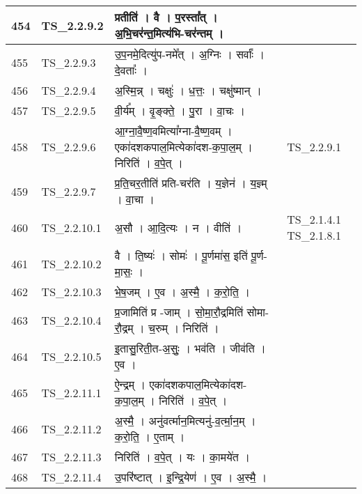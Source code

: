 \documentclass[17pt]{extarticle}
\begin{document}
\begin{longtable}{||p{0.4in}||p{0.9in}||p{4.0in}||p{0.9in}||}
        \hline
            454 & TS\_2.2.9.2 & प्रतीति॑   ।   वै   ।   प॒रस्ता᳚त्   ।   अ॒भि॒चर॑न्त॒मित्य॑भि{-}चर॑न्तम्   ।    &      \\
        \hline
            455 & TS\_2.2.9.3 & उ॒प॒नमे॒दित्यु॑प{-}नमे᳚त्   ।   अ॒ग्निः   ।   सर्वाः᳚   ।   दे॒वताः᳚   ।    &      \\
        \hline
            456 & TS\_2.2.9.4 & अ॒स्मि॒न्न्   ।   चक्षुः॑   ।   ध॒त्तः॒   ।   चक्षु॑ष्मान्   ।    &      \\
        \hline
            457 & TS\_2.2.9.5 & वी॒र्य᳚म्   ।   वृ॒ङ्क्ते॒   ।   पु॒रा   ।   वा॒चः   ।    &      \\
        \hline
            458 & TS\_2.2.9.6 & आ॒ग्ना॒वै॒ष्ण॒वमित्या᳚ग्ना{-}वै॒ष्ण॒वम्   ।   एका॑दशकपाल॒मित्येका॑दश{-}क॒पा॒ल॒म्   ।   निरिति॑   ।   व॒पे॒त्   ।    & TS\_2.2.9.1        \\
        \hline
            459 & TS\_2.2.9.7 & प्र॒ति॒चर॒तीति॑ प्रति{-}चर॑ति   ।   य॒ज्ञेन॑   ।   य॒ज्ञ्म्   ।   वा॒चा   ।    &      \\
        \hline
            460 & TS\_2.2.10.1 & अ॒सौ   ।   आ॒दि॒त्यः   ।   न   ।   वीति॑   ।    & TS\_2.1.4.1 TS\_2.1.8.1        \\
        \hline
            461 & TS\_2.2.10.2 & वै   ।   ति॒ष्यः॑   ।   सोमः॑   ।   पू॒र्णमा॑स॒ इति॑ पू॒र्ण{-}मा॒सः॒   ।    &      \\
        \hline
            462 & TS\_2.2.10.3 & भे॒ष॒जम्   ।   ए॒व   ।   अ॒स्मै॒   ।   क॒रो॒ति॒   ।    &      \\
        \hline
            463 & TS\_2.2.10.4 & प्र॒जामिति॑ प्र {-}जाम्   ।   सो॒मा॒रौ॒द्रमिति॑ सोमा{-} रौ॒द्रम्   ।   च॒रुम्   ।   निरिति॑   ।    &      \\
        \hline
            464 & TS\_2.2.10.5 & इ॒तासु॒रिती॒त{-}अ॒सुः॒   ।   भव॑ति   ।   जीव॑ति   ।   ए॒व   ।    &      \\
        \hline
            465 & TS\_2.2.11.1 & ऐ॒न्द्रम्   ।   एका॑दशकपाल॒मित्येका॑दश{-}क॒पा॒ल॒म्   ।   निरिति॑   ।   व॒पे॒त्   ।    &      \\
        \hline
            466 & TS\_2.2.11.2 & अ॒स्मै॒   ।   अनु॑वर्त्मान॒मित्यनु॑{-}व॒र्त्मा॒न॒म्   ।   क॒रो॒ति॒   ।   ए॒ताम्   ।    &      \\
        \hline
            467 & TS\_2.2.11.3 & निरिति॑   ।   व॒पे॒त्   ।   यः   ।   का॒मये॑त   ।    &      \\
        \hline
            468 & TS\_2.2.11.4 & उ॒परि॑ष्टात्   ।   इ॒न्द्रि॒येण॑   ।   ए॒व   ।   अ॒स्मै॒   ।    &      \\

\end{longtable}
\end{document}
